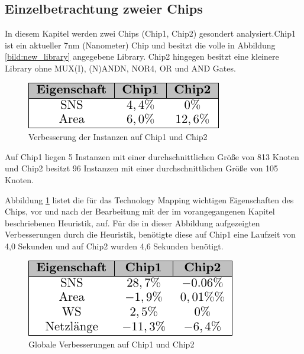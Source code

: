 \documentclass[11pt, a4paper, german]{article}
\newcommand{\TM}{Technology  Mapping }
\begin{document}
\subsection{Einzelbetrachtung zweier Chips}
In diesem Kapitel werden zwei Chips (Chip1, Chip2) gesondert analysiert.Chip1 ist ein aktueller 7nm (Nanometer) Chip und besitzt die volle in Abbildung \ref{bild:new_library} angegebene Library. 
Chip2 hingegen besitzt eine kleinere Library ohne MUX(I), (N)ANDN, NOR4, OR und AND Gates. \\
\begin{figure}
		\includegraphics[width=1\linewidth]{pictures/tex_files/analysis/einzelchip_test_heur}
		\caption{Verbesserung der Instanzen auf Chip1 und Chip2}
		\label{bild:einzelchip}
	\end{figure}
Auf Chip1 liegen 5 Instanzen mit einer durchschnittlichen Gr\"o{\ss}e von 813 Knoten und Chip2 besitzt 96 Instanzen mit einer durchschnittlichen Gr\"o{\ss}e von 105 Knoten.

Abbildung \ref{bild:einzelchip} listet die f\"ur das \TM wichtigen Eigenschaften des Chips, vor und nach der Bearbeitung mit der im vorangegangenen Kapitel beschriebenen Heuristik, auf. 
F\"ur die in dieser Abbildung aufgezeigten Verbesserungen durch die Heuristik, ben\"otigte diese auf Chip1 eine Laufzeit von 4,0 Sekunden und auf Chip2 wurden 4,6 Sekunden ben\"otigt.
\begin{figure}
		\includegraphics[width=1\linewidth]{pictures/tex_files/analysis/einzelchip_test_allg}
		\caption{Globale Verbesserungen auf Chip1 und Chip2}
		\label{bild:einzelchip_allg}
	\end{figure}
\end{document}
